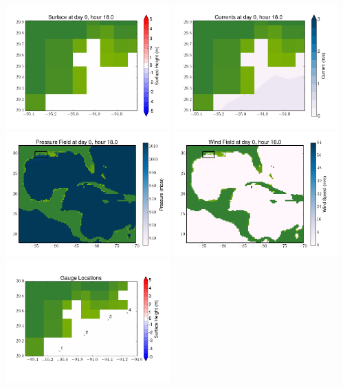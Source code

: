 \documentclass[11pt]{article}
\begin{document}
\includegraphics[width=0.475\textwidth]{frame0090fig6.png}
\vskip 10pt 
\includegraphics[width=0.475\textwidth]{frame0090fig7.png}
\includegraphics[width=0.475\textwidth]{frame0090fig8.png}
\vskip 10pt 
\includegraphics[width=0.475\textwidth]{frame0090fig9.png}
\includegraphics[width=0.475\textwidth]{frame0090fig10.png}
\end{document}
